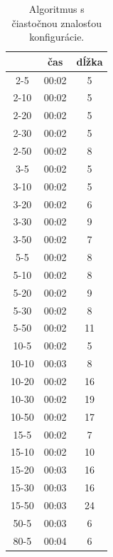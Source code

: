 \documentclass[
  printed, %
  oneside, %
  notable,   %
  nolof,     %
  nolot,     %
]{fithesis3}
\begin{document}
\begin{table}[hp!]
\centering
\begin{tabular}{c|c|c}
 & čas & dĺžka \\ \hline
2-5  & \cellcolor{table-green}00:02 & \cellcolor{table-green}5 \\ 
2-10  & \cellcolor{table-green}00:02 & \cellcolor{table-green}5 \\ 
2-20  & 00:02 & 5 \\
2-30  & 00:02 & 5 \\
2-50  & 00:02 & 8 \\ \hline 
3-5  & \cellcolor{table-green}00:02 & \cellcolor{table-green}5 \\ 
3-10  & \cellcolor{table-green}00:02 & \cellcolor{table-green}5 \\ 
3-20  & 00:02 & 6 \\
3-30  & \cellcolor{table-green}00:02 & \cellcolor{table-green}9 \\ 
3-50  & 00:02 & 7 \\ \hline 
5-5  & \cellcolor{table-green}00:02 & \cellcolor{table-green}8 \\ 
5-10  & 00:02 & 8 \\
5-20  & 00:02 & 9 \\
5-30  & 00:02 & 8 \\
5-50  & 00:02 & 11 \\ \hline 
10-5  & \cellcolor{table-green}00:02 & \cellcolor{table-green}5 \\ 
10-10  & 00:03 & 8 \\
10-20  & \cellcolor{table-green}00:02 & \cellcolor{table-green}16 \\ 
10-30  & 00:02 & 19 \\
10-50  & 00:02 & 17 \\ \hline
15-5  & 00:02 & 7 \\
15-10  & 00:02 & 10 \\
15-20  & 00:03 & 16 \\
15-30  & 00:03 & 16 \\
15-50  & 00:03 & 24 \\ \hline
50-5  & \cellcolor{table-green}00:03 & \cellcolor{table-green}6 \\ \hline
80-5  & \cellcolor{table-green}00:04 & \cellcolor{table-green}6 \\ 
\end{tabular}%
\caption{Algoritmus s čiastočnou znalosťou konfigurácie. }
\label{tab:algo2}
\end{table}
\end{document}
